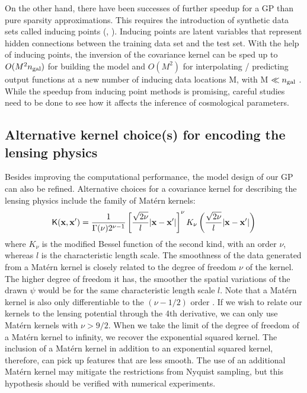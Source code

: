 On the other hand, there have been successes of further speedup for a GP than
pure sparsity approximations. This requires the introduction of  
 synthetic data sets called inducing points (\citealt{Snelson2006},
\citealt{Rasmussen2006}). Inducing points are latent variables that represent
hidden connections between the training data set and the test set. 
With the help 
of inducing points,
the inversion of the covariance kernel can be sped up to
$O(M^2 n_{\rm gal})$ for
building the model and $O(M^2)$ for interpolating / predicting output functions
at a new number of inducing data locations M, with M $\ll n_{\rm gal}$ 
\citep{Snelson2006}. While the speedup from inducing point methods is
promising, careful studies need to be done to see how it affects the
inference of cosmological parameters. 
  
\subsection{Alternative kernel choice(s) for encoding the lensing physics}
Besides improving the computational performance, the model design of our GP can
also be refined.
Alternative choices for a covariance kernel for describing the lensing physics 
include the family of Mat\'{e}rn kernels:
\begin{equation}
	\mathsf{K}(\mathbf{x}, \mathbf{x}') = \frac{1}{\Gamma(\nu)2^{\nu-1}}\left[
		\frac{\sqrt{2\nu}}{l}|\mathbf{x} - \mathbf{x}'|
	\right]^\nu K_\nu \left(\frac{\sqrt{2\nu}}{l}|\mathbf{x}-\mathbf{x}'|\right) 
\end{equation}
where $K_\nu$ is the modified Bessel function of the second kind, with an order
$\nu$, whereas $l$ is the characteristic length scale.
The smoothness of the data generated from a Mat\'{e}rn kernel is closely
related to the degree of freedom $\nu$ of the kernel. 
The higher degree of freedom it has, the smoother the spatial variations of the
drawn $\psi$ would be for the same characteristic length scale $l$.
Note that a Mat\'{e}rn kernel is also only differentiable to the $(\nu-1/2)$ order
\citep{Rasmussen2006}.
If we wish to relate our kernels to the lensing potential through the 4th
derivative, we can only use Mat\'{e}rn kernels with $\nu > 9/2$. 
When we take the limit of the degree of freedom of a Mat\'{e}rn kernel to infinity, 
we recover the exponential squared kernel. The inclusion of a Mat\'{e}rn kernel
in addition to an exponential squared kernel, therefore, can pick up features
that are less smooth. The use of an additional Mat\'{e}rn kernel may mitigate the
restrictions from Nyquist sampling, but this hypothesis should be verified with
numerical experiments. 

